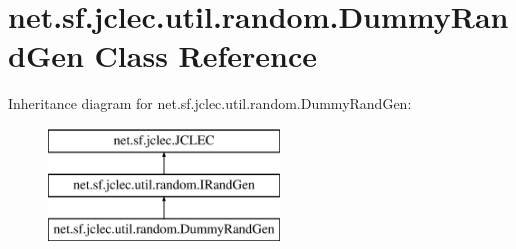 \hypertarget{classnet_1_1sf_1_1jclec_1_1util_1_1random_1_1_dummy_rand_gen}{\section{net.\-sf.\-jclec.\-util.\-random.\-Dummy\-Rand\-Gen Class Reference}
\label{classnet_1_1sf_1_1jclec_1_1util_1_1random_1_1_dummy_rand_gen}
}
Inheritance diagram for net.\-sf.\-jclec.\-util.\-random.\-Dummy\-Rand\-Gen\-:\begin{figure}[H]
\begin{center}
\leavevmode
\includegraphics[height=3.000000cm]{classnet_1_1sf_1_1jclec_1_1util_1_1random_1_1_dummy_rand_gen}
\end{center}
\end{figure}
